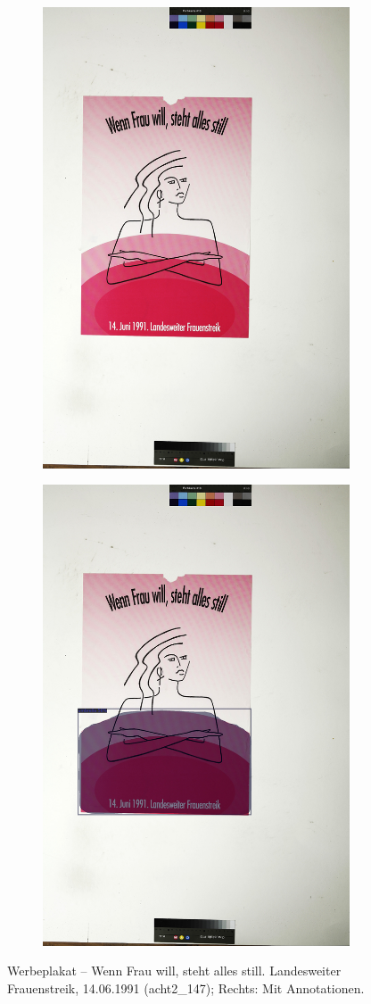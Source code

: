 \documentclass[a4paper,12pt,ngerman]{article}
\begin{document}
\newpage
\begin{landscape}
\begin{figure}[ht]
	\begin{subfigure}[b]{0.5\linewidth}
	\centering
	\includegraphics[height=\linewidth]{Abbildung_40_(acht2_147)}
	\end{subfigure}
	\begin{subfigure}[b]{0.5\linewidth}
	\centering
	\includegraphics[height=\linewidth]{Abbildung_40_(acht2_147)_with_detections}
	\end{subfigure}
	\caption{Werbeplakat – Wenn Frau will, steht alles still. Landesweiter Frauenstreik, 14.06.1991 (acht2\_147); Rechts: Mit Annotationen.}
\end{figure}
\end{landscape}
\end{document}
